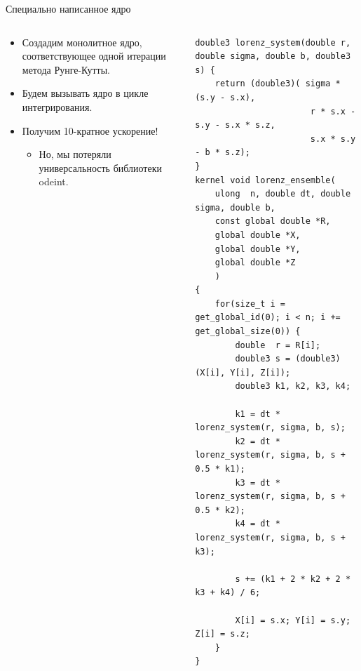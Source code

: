 \documentclass[@BEAMER_OPTIONS@]{beamer}
\begin{document}
\begin{frame}[fragile]{Специально написанное ядро}
    \begin{columns}
        \begin{column}{0.45\textwidth}
            \begin{itemize}
                \item Создадим монолитное ядро, соответствующее одной итерации
                    метода Рунге-Кутты.
                \item Будем вызывать ядро в цикле интегрирования.
                    \vspace{\baselineskip}
                \item Получим 10-кратное ускорение!
                    \begin{itemize}
                        \item<2|alert@2> Но, мы потеряли универсальность библиотеки
                            odeint.
                    \end{itemize}
            \end{itemize}
        \end{column} \quad \quad
        \begin{column}{0.5\textwidth}
            \begin{exampleblock}{}
                \begin{adjustbox}{width=0.95\textwidth,height=0.95\textheight,keepaspectratio}
                    \begin{lstlisting}
double3 lorenz_system(double r, double sigma, double b, double3 s) {
    return (double3)( sigma * (s.y - s.x),
                       r * s.x - s.y - s.x * s.z,
                       s.x * s.y - b * s.z);
}
kernel void lorenz_ensemble(
    ulong  n, double dt, double sigma, double b,
    const global double *R,
    global double *X,
    global double *Y,
    global double *Z
    )
{
    for(size_t i = get_global_id(0); i < n; i += get_global_size(0)) {
        double  r = R[i];
        double3 s = (double3)(X[i], Y[i], Z[i]);
        double3 k1, k2, k3, k4;

        k1 = dt * lorenz_system(r, sigma, b, s);
        k2 = dt * lorenz_system(r, sigma, b, s + 0.5 * k1);
        k3 = dt * lorenz_system(r, sigma, b, s + 0.5 * k2);
        k4 = dt * lorenz_system(r, sigma, b, s + k3);

        s += (k1 + 2 * k2 + 2 * k3 + k4) / 6;

        X[i] = s.x; Y[i] = s.y; Z[i] = s.z;
    }
}
                    \end{lstlisting}
                \end{adjustbox}
            \end{exampleblock}
        \end{column}
    \end{columns}
\end{frame}
\end{document}
